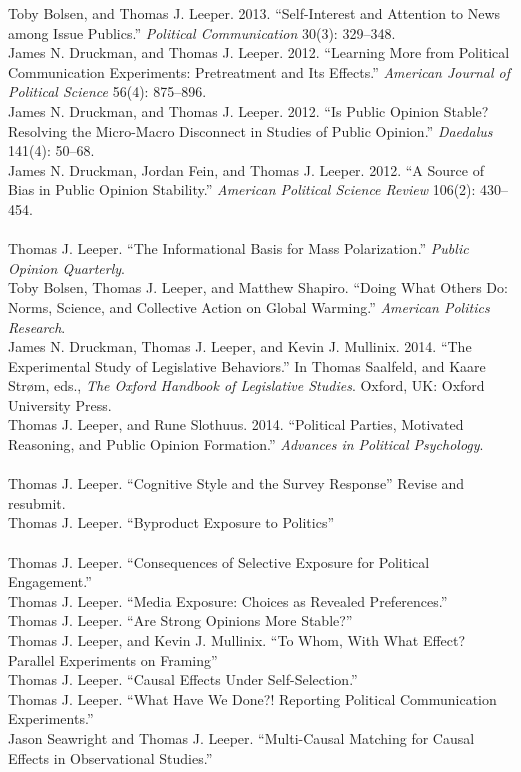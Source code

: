 \documentclass[12pt]{article}
\renewcommand{\section}[1]{\pagebreak[3]%
    \llap{\scshape\smash{\parbox[t]{\marginparwidth}{\raggedright {\color{lg}#1}}}}%
    \vspace{-\baselineskip}\par}
\newcommand{\topic}[1]{\pagebreak[3]\indent {\color{lg}{\footnotesize #1 }}\\}
\newcommand{\entry}[1]{\indent {\color{lg}\guillemotright}\hspace{2pt}#1\vspace{.25em}\\}
\begin{document}
\section{Publications}
\entry{Toby Bolsen, and Thomas J. Leeper. 2013. ``Self-Interest and Attention to News among Issue Publics.'' {\em Political Communication} 30(3): 329--348.}
\entry{James N. Druckman, and Thomas J. Leeper. 2012. ``Learning More from Political Communication Experiments: Pretreatment and Its Effects.'' {\em American Journal of Political Science} 56(4): 875--896.}
\entry{James N. Druckman, and Thomas J. Leeper. 2012. ``Is Public Opinion Stable? Resolving the Micro-Macro Disconnect in Studies of Public Opinion.'' {\em Daedalus} 141(4): 50--68.}
\entry{James N. Druckman, Jordan Fein, and Thomas J. Leeper. 2012. ``A Source of Bias in Public Opinion Stability.'' {\em American Political Science Review} 106(2): 430--454.}

\topic{Forthcoming}
\entry{Thomas J. Leeper. ``The Informational Basis for Mass Polarization.'' {\em Public Opinion Quarterly}.}
\entry{Toby Bolsen, Thomas J. Leeper, and Matthew Shapiro. ``Doing What Others Do: Norms, Science, and Collective Action on Global Warming.'' {\em American Politics Research}.}
\entry{James N. Druckman, Thomas J. Leeper, and Kevin J. Mullinix. 2014. ``The Experimental Study of Legislative Behaviors.'' In Thomas Saalfeld, and Kaare Str\o m, eds., {\em The Oxford Handbook of Legislative Studies}. Oxford, UK: Oxford University Press.}
\entry{Thomas J. Leeper, and Rune Slothuus. 2014. ``Political Parties, Motivated Reasoning, and Public Opinion Formation.'' {\em Advances in Political Psychology}.}

\topic{Under Review}
\entry{Thomas J. Leeper. ``Cognitive Style and the Survey Response'' Revise and resubmit.}
\entry{Thomas J. Leeper. ``Byproduct Exposure to Politics''}

\topic{Working Papers and Ongoing Projects}
\entry{Thomas J. Leeper. ``Consequences of Selective Exposure for Political Engagement.''}
\entry{Thomas J. Leeper. ``Media Exposure: Choices as Revealed Preferences.''}
\entry{Thomas J. Leeper. ``Are Strong Opinions More Stable?''}
\entry{Thomas J. Leeper, and Kevin J. Mullinix. ``To Whom, With What Effect? Parallel Experiments on Framing''}
\entry{Thomas J. Leeper. ``Causal Effects Under Self-Selection.''}
\entry{Thomas J. Leeper. ``What Have We Done?! Reporting Political Communication Experiments.''}
\entry{Jason Seawright and Thomas J. Leeper. ``Multi-Causal Matching for Causal Effects in Observational Studies.''}
\end{document}
